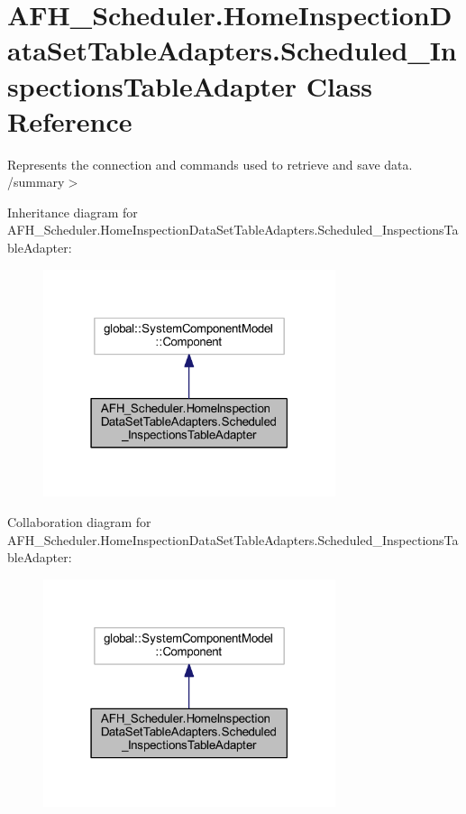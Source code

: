 \section{A\+F\+H\+\_\+\+Scheduler.\+Home\+Inspection\+Data\+Set\+Table\+Adapters.\+Scheduled\+\_\+\+Inspections\+Table\+Adapter Class Reference}
\label{class_a_f_h___scheduler_1_1_home_inspection_data_set_table_adapters_1_1_scheduled___inspections_table_adapter}


Represents the connection and commands used to retrieve and save data. /summary$>$  




Inheritance diagram for A\+F\+H\+\_\+\+Scheduler.\+Home\+Inspection\+Data\+Set\+Table\+Adapters.\+Scheduled\+\_\+\+Inspections\+Table\+Adapter\+:
\nopagebreak
\begin{figure}[H]
\begin{center}
\leavevmode
\includegraphics[width=243pt]{class_a_f_h___scheduler_1_1_home_inspection_data_set_table_adapters_1_1_scheduled___inspections_table_adapter__inherit__graph}
\end{center}
\end{figure}


Collaboration diagram for A\+F\+H\+\_\+\+Scheduler.\+Home\+Inspection\+Data\+Set\+Table\+Adapters.\+Scheduled\+\_\+\+Inspections\+Table\+Adapter\+:
\nopagebreak
\begin{figure}[H]
\begin{center}
\leavevmode
\includegraphics[width=243pt]{class_a_f_h___scheduler_1_1_home_inspection_data_set_table_adapters_1_1_scheduled___inspections_table_adapter__coll__graph}
\end{center}
\end{figure}
